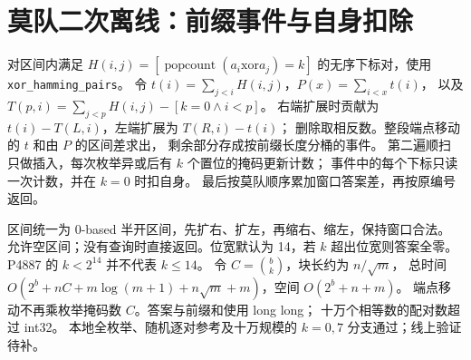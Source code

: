 \section{莫队二次离线：前缀事件与自身扣除}\label{knowledge-mo-secondary}
对区间内满足 $H(i,j)=[\operatorname{popcount}(a_i\mathbin{\mathrm{xor}}a_j)=k]$
的无序下标对，使用 \texttt{xor\_hamming\_pairs}。
令 $t(i)=\sum_{j<i}H(i,j)$，$P(x)=\sum_{i<x}t(i)$，
以及 $T(p,i)=\sum_{j<p}H(i,j)-[k=0\land i<p]$。
右端扩展时贡献为 $t(i)-T(L,i)$，左端扩展为 $T(R,i)-t(i)$；
删除取相反数。整段端点移动的 $t$ 和由 $P$ 的区间差求出，
剩余部分存成按前缀长度分桶的事件。
第二遍顺扫只做插入，每次枚举异或后有 $k$ 个置位的掩码更新计数；
事件中的每个下标只读一次计数，并在 $k=0$ 时扣自身。
最后按莫队顺序累加窗口答案差，再按原编号返回。

区间统一为 0-based 半开区间，先扩右、扩左，再缩右、缩左，保持窗口合法。
允许空区间；没有查询时直接返回。位宽默认为 14，若 $k$ 超出位宽则答案全零。
P4887 的 $k<2^{14}$ 并不代表 $k\le14$。
令 $C=\binom{b}{k}$，块长约为 $n/\sqrt m$，
总时间 $O(2^b+nC+m\log(m+1)+n\sqrt m+m)$，空间 $O(2^b+n+m)$。
端点移动不再乘枚举掩码数 $C$。答案与前缀和使用 long long；
十万个相等数的配对数超过 int32。
本地全枚举、随机逐对参考及十万规模的 $k=0,7$ 分支通过；线上验证待补。

